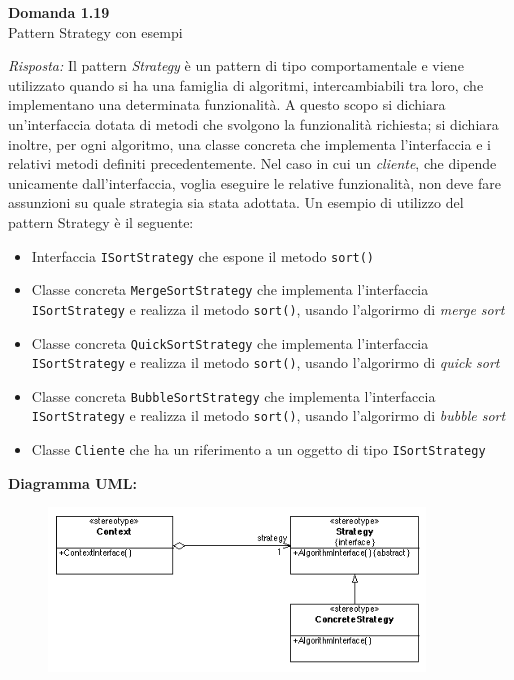 \documentclass{article}
\newenvironment{problem}[2][Domanda]
    { \begin{mdframed}[backgroundcolor=gray!20] \textbf{#1 #2} \\}
    {  \end{mdframed}}
\newenvironment{solution}
    {\textit{Risposta:}}
    {}
\begin{document}
\begin{problem}{1.19}
Pattern Strategy con esempi
\end{problem}
\begin{solution}
Il pattern \textit{Strategy} è un pattern di tipo comportamentale e viene utilizzato quando si ha una famiglia di algoritmi, intercambiabili tra loro, che implementano una determinata funzionalità.
A questo scopo si dichiara un'interfaccia dotata di metodi che svolgono la funzionalità richiesta; si dichiara inoltre, per ogni algoritmo, una classe concreta che implementa l'interfaccia e i relativi metodi definiti precedentemente.
\newline
Nel caso in cui un \textit{cliente}, che dipende unicamente dall'interfaccia, voglia eseguire le relative funzionalità, non deve fare assunzioni su quale strategia sia stata adottata.
\newline
Un esempio di utilizzo del pattern Strategy è il seguente:
\begin{itemize}
	\item Interfaccia \texttt{ISortStrategy} che espone il metodo \texttt{sort()}
	\item Classe concreta \texttt{MergeSortStrategy} che implementa l'interfaccia \texttt{ISortStrategy} e realizza il metodo \texttt{sort()}, usando l'algorirmo di \textit{merge sort}
	\item Classe concreta \texttt{QuickSortStrategy} che implementa l'interfaccia \texttt{ISortStrategy} e realizza il metodo \texttt{sort()}, usando l'algorirmo di \textit{quick sort}
	\item Classe concreta \texttt{BubbleSortStrategy} che implementa l'interfaccia \texttt{ISortStrategy} e realizza il metodo \texttt{sort()}, usando l'algorirmo di \textit{bubble sort}
	\item Classe \texttt{Cliente} che ha un riferimento a un oggetto di tipo \texttt{ISortStrategy}
\end{itemize}
\textbf{Diagramma UML:}
\begin{figure}[htb!]
	\centering
	\label{StrategyPattern}
	\includegraphics[width=10cm]{./immagini/strategyPattern.png}
\end{figure}
\end{solution}
\end{document}
